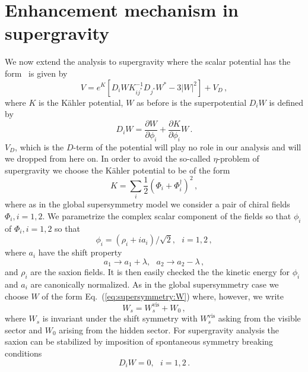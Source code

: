 \documentclass[12pt]{article}
\begin{document}
\section{Enhancement mechanism in supergravity \label{sec:Supergravity}}
We now extend the analysis to supergravity where the scalar potential has the form~\cite{Chamseddine:1982jx, Cremmer:1982en} is given by
\begin{equation} \label{eq:supergravity:potential}
  V = e^K \left[D_i W K^{-1}_{ij^*} D_{j^*} W^* - 3 \left|W\right|^2\right] + V_D\,,
\end{equation}
where $K$ is the K\"ahler potential, $W$ as before is the superpotential $D_i W$ is defined by
\begin{equation} \label{eq:supergravity:DW}
  D_i W = \frac{\partial W}{\partial \phi_i} + \frac{\partial K}{\partial \phi_i} W\,.
\end{equation}
$V_D$, which is the $D$-term of the potential will play no role in our analysis and will we dropped from here on.
In order to avoid the so-called $\eta$-problem of supergravity we choose the K\"ahler potential to be of the form
\begin{equation}
  K = \sum_i \frac{1}{2} \left(\Phi_i + \Phi_i^\dagger\right)^2\,,
\end{equation}
where as in the global supersymmetry model we consider a pair of chiral fields $\Phi_i, i = 1, 2$.
We parametrize the complex scalar component of the fields so that $\phi_i$ of $\Phi_i, i = 1, 2$ so that
\begin{equation}
  \phi_i = \left(\rho_i + i a_i\right) / \sqrt 2,
  ~~~ i = 1, 2\,,
\end{equation}
where $a_i$ have the shift property
\begin{equation}
  a_1 \to a_1 + \lambda,
  ~~~ a_2 \to a_2 - \lambda\,,
\end{equation}
and $\rho_i$ are the saxion fields.
It is then easily checked the the kinetic energy for $\phi_i$ and $a_i$ are canonically normalized.
As in the global supersymmetry case we choose $W$ of the form Eq.~(\ref{eq:supersymmetry:W}) where, however, we write
\begin{equation}
  W_s = W_s^\text{vis} + W_0\,,
\end{equation}
where $W_s$ is invariant under the shift symmetry with $W_s^\text{vis}$ asking from the visible sector and $W_0$ arising from the hidden sector.
For supergravity analysis the saxion can be stabilized by imposition of spontaneous symmetry breaking conditions~\cite{Nath:1983aw}
\begin{equation}
  D_i W = 0,
  ~~~ i = 1, 2\,.
\end{equation}
\end{document}
